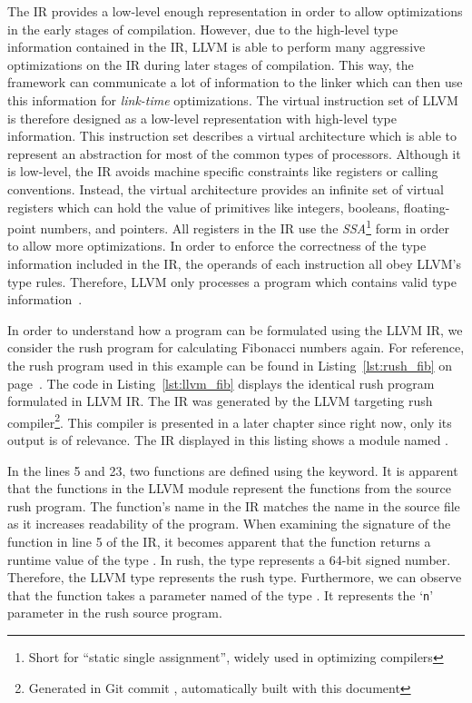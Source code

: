The IR provides a low-level enough representation in order to allow optimizations in the early stages of compilation.
However, due to the high-level type information contained in the IR,
LLVM is able to perform many aggressive optimizations on the IR during later stages of compilation.
This way, the framework can communicate a lot of information to the linker which can then use this information for \emph{link-time} optimizations.
The virtual instruction set of LLVM is therefore designed as a low-level representation with high-level type information.
This instruction set describes a virtual architecture which is able to represent an abstraction for most of the common types of processors.
Although it is low-level, the IR avoids machine specific constraints like registers or calling conventions.
Instead, the virtual architecture provides an infinite set of virtual registers which can hold the value of primitives like integers, booleans, floating-point numbers, and pointers.
All registers in the IR use the \emph{SSA}\footnote{Short for \enquote{static single assignment}, widely used in optimizing compilers} form in order to allow more optimizations.
In order to enforce the correctness of the type information included in the IR, the operands of each instruction all obey LLVM's type rules.
Therefore, LLVM only processes a program which contains valid type information~\cite[p.~14-17]{Lattner:MSThesis02}.

In order to understand how a program can be formulated using the LLVM IR, we consider the rush program for calculating Fibonacci numbers again.
For reference, the rush program used in this example can be found in Listing~\ref{lst:rush_fib} on page~\pageref{lst:rush_fib}.
The code in Listing~\ref{lst:llvm_fib} displays the identical rush program formulated in LLVM IR\@.
The IR was generated by the LLVM targeting rush compiler\footnote{Generated in Git commit \rushCommit{}, automatically built with this document}.
This compiler is presented in a later chapter since right now, only its output is of relevance.
The IR displayed in this listing shows a module named .


In the lines 5 and 23, two functions are defined using the  keyword.
It is apparent that the functions in the LLVM module represent the functions from the source rush program.
The function's name in the IR matches the name in the source file as it increases readability of the program.
When examining the signature of the  function in line 5 of the IR,
it becomes apparent that the function returns a runtime value of the type .
In rush, the  type represents a 64-bit signed number.
Therefore, the  LLVM type represents the rush  type.
Furthermore, we can observe that the function takes a parameter named  of the type .
It represents the `\texttt{n}' parameter in the rush source program.


